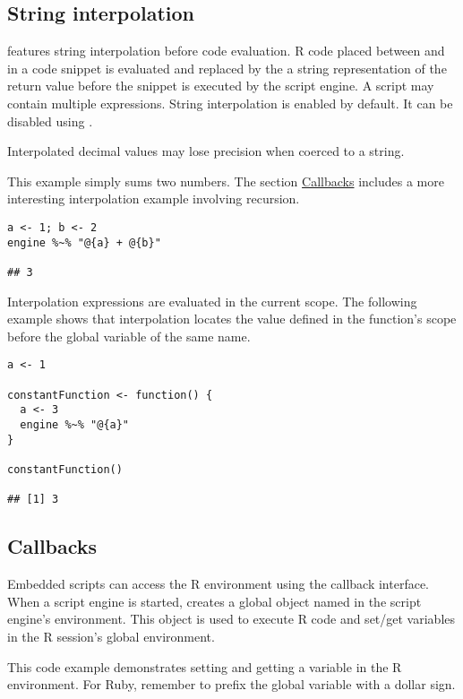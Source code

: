 \subsection{String interpolation}

 features string interpolation before code evaluation. R code placed between  and \code{\}} in a code snippet is evaluated and replaced by the a string representation of the return value before the snippet is executed by the script engine. A script may contain multiple  expressions. String interpolation is enabled by default. It can be disabled using .

 Interpolated decimal values may lose precision when coerced to a string.

This example simply sums two numbers. The section \hyperlink{callbacks}{Callbacks} includes a more interesting interpolation example involving recursion.

\begin{verbatim}
a <- 1; b <- 2
engine %~% "@{a} + @{b}"

## 3
\end{verbatim}

Interpolation expressions are evaluated in the current scope. The following example shows that interpolation locates the value defined in the function's scope before the global variable of the same name.

\begin{verbatim}
a <- 1

constantFunction <- function() {
  a <- 3
  engine %~% "@{a}"
}

constantFunction()

## [1] 3
\end{verbatim}

\hypertarget{callbacks}{\subsection{Callbacks}}

Embedded scripts can access the R environment using the  callback interface. When a script engine is started,  creates a global object named  in the script engine's environment. This object is used to execute R code and set/get variables in the R session's global environment.

This code example demonstrates setting and getting a variable in the R environment. For Ruby, remember to prefix the global variable  with a dollar sign.

